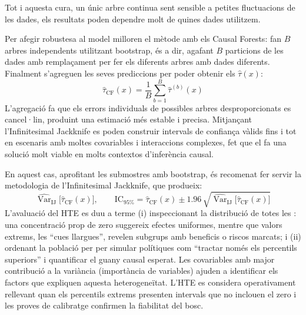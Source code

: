 \documentclass[../main.tex]{subfiles}
\begin{document}
    \vspace{1cm}
    
    Tot i aquesta cura, un únic arbre continua sent sensible a petites fluctuacions de les dades, els resultats poden dependre molt de quines dades utilitzem.\par 
    Per afegir robustesa al model \cite{wager2018CF} milloren el mètode amb els Causal Forests: fan $B$ arbres independents utilitzant bootstrap, és a dir, agafant $B$ particions de les dades amb remplaçament per fer els diferents arbres amb dades diferents. Finalment s’agreguen les seves prediccions per poder obtenir els $\hat{\tau}(x)$:
    \begin{equation}
        \hat{\tau}_{\text{CF}}(x)=\frac{1}{B}\sum_{b=1}^{B}\hat{\tau}^{(b)}(x)
    \end{equation}
    L’agregació fa que els errors individuals de possibles arbres desproporcionats es cancel·lin, produint una estimació més estable i precisa. Mitjançant l’Infinitesimal Jackknife es poden construir intervals de confiança vàlids fins i tot en escenaris amb moltes covariables i interaccions complexes, fet que el fa una solució molt viable en molts contextos d'inferència causal.\par
    En aquest cas, aprofitant les submostres amb bootstrap, és recomenat fer servir la metodologia de l’Infinitesimal Jackknife, que produeix:
    \begin{equation}
        \widehat{\operatorname{Var}}_{\mathrm{IJ}}\!\bigl[\hat{\tau}_{\mathrm{CF}}(x)\bigr],
        \qquad
        \text{IC}_{95\%}= \hat{\tau}_{\mathrm{CF}}(x) \pm 1.96\,
        \sqrt{\widehat{\operatorname{Var}}_{\mathrm{IJ}}\!\bigl[\hat{\tau}_{\mathrm{CF}}(x)\bigr]}
    \end{equation}
    L’avaluació del HTE es duu a terme (i) inspeccionant la distribució de totes les : una concentració prop de zero suggereix efectes uniformes, mentre que valors extrems, les “cues llargues”, revelen subgrups amb beneficis o riscos marcats; i (ii) ordenant la població per per simular polítiques com “tractar només els percentils superiors” i quantificar el guany causal esperat. Les covariables amb major contribució a la variància (importància de variables) ajuden a identificar els factors que expliquen aquesta heterogeneïtat. L’HTE es considera operativament rellevant quan els percentils extrems presenten intervals que no inclouen el zero i les proves de calibratge confirmen la fiabilitat del bosc.
\end{document}

